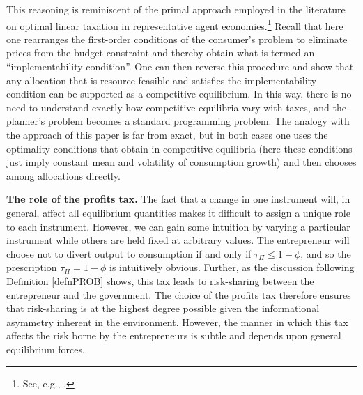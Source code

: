 \documentclass[11pt]{article}
\theoremstyle{plain}
\theoremstyle{definition} %
\begin{document}
This reasoning is reminiscent of the primal approach employed in the literature on optimal linear taxation in representative agent economies.\footnote{See, e.g., \cite{chari_optimal_1999}.} Recall that here one rearranges the first-order conditions of the consumer's problem to eliminate prices from the budget constraint and thereby obtain what is termed an ``implementability condition''. One can then reverse this procedure and show that any allocation that is resource feasible and satisfies the implementability condition can be supported as a competitive equilibrium. In this way, there is no need to understand exactly how competitive equilibria vary with taxes, and the planner's problem becomes a standard programming problem. The analogy with the approach of this paper is far from exact, but in both cases one uses the optimality conditions that obtain in competitive equilibria (here these conditions just imply constant mean and volatility of consumption growth) and then chooses among allocations directly.

\textbf{The role of the profits tax.} The fact that a change in one instrument will, in general, affect all equilibrium quantities makes it difficult to assign a unique role to each instrument. However, we can gain some intuition by varying a particular instrument while others are held fixed at arbitrary values. The entrepreneur will choose not to divert output to consumption if and only if $\tau_{\Pi} \leq 1 - \phi$, and so the prescription $\tau_{\Pi} = 1 - \phi$ is intuitively obvious. Further, as the discussion following Definition \ref{defnPROB} shows, this tax leads to risk-sharing between the entrepreneur and the government. The choice of the profits tax therefore ensures that risk-sharing is at the highest degree possible given the informational asymmetry inherent in the environment. However, the manner in which this tax affects the risk borne by the entrepreneurs is subtle and depends upon general equilibrium forces. 
\end{document}
